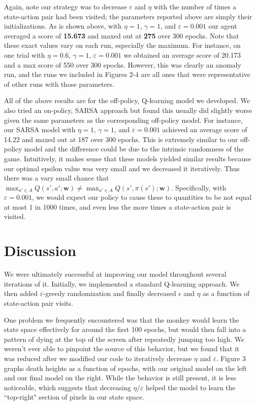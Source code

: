 \documentclass[11pt]{article}
\begin{document}
Again, note our strategy was to decrease $\varepsilon$ and $\eta$ with the number of times a state-action pair had been visited; the parameters reported above are simply their initializations. As is shown above, with $\eta=1$, $\gamma=1$, and $\varepsilon=0.001$ our agent averaged a score of \textbf{15.673} and maxed out at \textbf{275} over 300 epochs. Note that these exact values vary on each run, especially the maximum. For instance, on one trial with $\eta=0.6$, $\gamma=1$, $\varepsilon=0.001$ we obtained an average score of 20.173 and a max score of 550 over 300 epochs. However, this was clearly an anomaly run, and the runs we included in Figures 2-4 are all ones that were representative of other runs with those parameters.

All of the above results are for the off-policy, Q-learning model we developed. We also tried an on-policy, SARSA approach but found this usually did slightly worse given the same parameters as the corresponding off-policy model. For instance, our SARSA model with $\eta=1$, $\gamma=1$, and $\varepsilon=0.001$ achieved an average score of 14.22 and maxed out at 187 over 300 epochs. This is extremely similar to our off-policy model and the difference could be due to the intrinsic randomness of the game. Intuitively, it makes sense that these models yielded similar results because our optimal epsilon value was very small and we decreased it iteratively. Thus there was a vary small chance that $\max_{a' \in A} Q(s',a';\mathbf{w}) \neq \max_{a' \in A} Q(s',\pi(s');\mathbf{w})$. Specifically, with $\varepsilon=0.001$, we would expect our policy to cause these to quantities to be not equal at most 1 in 1000 times, and even less the more times a state-action pair is visited.

\section{Discussion} 
We were ultimately successful at improving our model throughout several iterations of it. Initially, we implemented a standard Q-learning approach. We then added $\varepsilon$-greedy randomization and finally decreased $\epsilon$ and $\eta$ as a function of state-action pair visits.

One problem we frequently encountered was that the monkey would learn the state space effectively for around the first 100 epochs, but would then fall into a pattern of dying at the top of the screen after repeatedly jumping too high. We weren't ever able to pinpoint the source of this behavior, but we found that it was reduced after we modified our code to iteratively decrease $\eta$ and $\varepsilon$. Figure 3 graphs death heights as a function of epochs, with our original model on the left and our final model on the right. While the behavior is still present, it is less noticeable, which suggests that decreasing $\eta$/$\varepsilon$ helped the model to learn the ``top-right" section of pixels in our state space.
\end{document}
